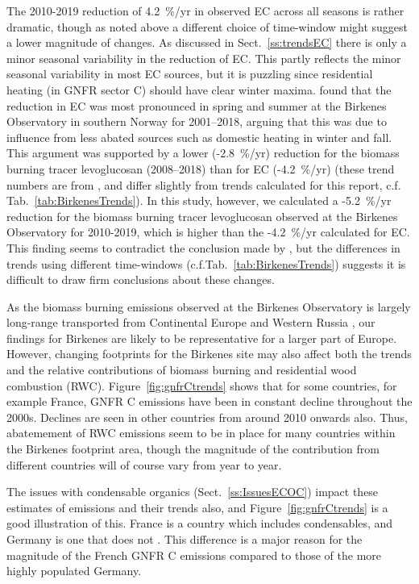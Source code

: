 The 2010-2019 reduction of 4.2~\%/yr in observed EC across all seasons is rather dramatic, though as noted above a different choice of time-window might suggest a lower magnitude of changes. 
As discussed in Sect.~\ref{ss:trendsEC} there is only a minor seasonal variability in the reduction of EC. This partly reflects the minor seasonal variability in most EC sources, but it is puzzling since residential heating (in GNFR sector C) should have clear winter maxima. \citet{Yttri2021} found that the reduction in EC
was most pronounced in spring and summer at the Birkenes Observatory in
southern Norway for 2001--2018, arguing that this was due to influence
from less abated sources such as domestic heating in winter and fall. This argument was
supported by a lower (-2.8~\%/yr) reduction for the biomass burning
tracer levoglucosan (2008--2018) than for EC (-4.2~\%/yr) (these trend numbers are from \citeauthor{Yttri2021}, and differ slightly from trends calculated for this report, c.f. Tab.~\ref{tab:BirkenesTrends}). In this study, however, 
we calculated a -5.2~\%/yr reduction for the biomass burning tracer
levoglucosan observed at the Birkenes Observatory for 2010-2019, which is
higher than the -4.2~\%/yr calculated for EC.
This finding seems to contradict the conclusion made
by \citet{Yttri2021}, but the differences in trends using different time-windows (c.f.Tab.~\ref{tab:BirkenesTrends}) suggests it is difficult to draw firm conclusions about these changes.


As the biomass burning emissions observed at the
Birkenes Observatory is largely long-range transported from Continental
Europe and Western Russia \citep{Yttri2021}, our findings for Birkenes
are likely to be representative for a larger part of Europe. However,
changing footprints  for the Birkenes site may also affect both the trends and
the relative contributions of biomass burning and residential wood combustion (RWC).
Figure~\ref{fig:gnfrCtrends} shows that for some countries, for example France, GNFR C \pmfine emissions have been in constant decline throughout the 2000s. Declines are seen in other countries from around 2010 onwards also. Thus, abatemement of RWC emissions seem to be in place for many countries within the Birkenes footprint area, though the magnitude of the contribution from different countries will of course vary from year to year.

The issues with condensable organics (Sect.~\ref{ss:IssuesECOC}) impact these estimates of \pmfine emissions and their trends also, and Figure~\ref{fig:gnfrCtrends} is a good illustration of this. France is a country which includes condensables, and Germany is one that does not \citep{CONDws2020}. This difference is a major reason for the magnitude of the French GNFR C emissions compared to those of the more highly populated Germany. 


